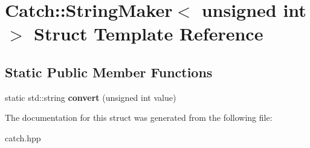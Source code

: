 \hypertarget{structCatch_1_1StringMaker_3_01unsigned_01int_01_4}{}\section{Catch\+::String\+Maker$<$ unsigned int $>$ Struct Template Reference}
\label{structCatch_1_1StringMaker_3_01unsigned_01int_01_4}
\subsection*{Static Public Member Functions}
\begin{DoxyCompactItemize}
\item 
\mbox{\label{structCatch_1_1StringMaker_3_01unsigned_01int_01_4_aa0ec816ef8a65664b0524d55d08e2fd9}} 
static std\+::string {\bfseries convert} (unsigned int value)
\end{DoxyCompactItemize}


The documentation for this struct was generated from the following file\+:\begin{DoxyCompactItemize}
\item 
catch.\+hpp\end{DoxyCompactItemize}
